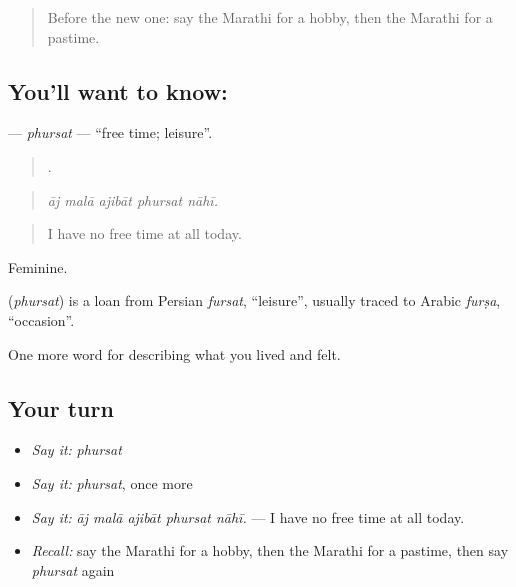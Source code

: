 \label{lesson:MR-C528-phursat}



\begin{quote}
Before the new one: say the Marathi for a hobby, then the Marathi for a pastime.
\end{quote}

\subsection*{You'll want to know: }
\textbf{} — \emph{phursat} — \textquotedblleft{}free time; leisure\textquotedblright{}.

\begin{quote}
    .
\end{quote}

\begin{quote}
\emph{āj malā ajibāt phursat nāhī.}
\end{quote}

\begin{quote}
I have no free time at all today.
\end{quote}

Feminine.

\begin{cousinweb}
\textbf{} (\emph{phursat}) is a loan from Persian \emph{fursat}, \textquotedblleft{}leisure\textquotedblright{}, usually traced to Arabic \emph{furṣa}, \textquotedblleft{}occasion\textquotedblright{}.
\end{cousinweb}

\begin{grammarlens}[title={What you've built}]
One more word for describing what you lived and felt.
\end{grammarlens}

\subsection*{Your turn}
\begin{itemize}
\raggedright
  \item \emph{Say it:} \emph{phursat}
  \item \emph{Say it:} \emph{phursat}, once more
  \item \emph{Say it:} \emph{āj malā ajibāt phursat nāhī.} — I have no free time at all today.
  \item \emph{Recall:} say the Marathi for a hobby, then the Marathi for a pastime, then say \emph{phursat} again
\end{itemize}

